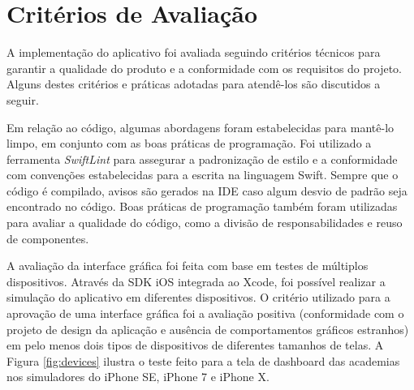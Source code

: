 \section{Critérios de Avaliação}
A implementação do aplicativo foi avaliada seguindo critérios técnicos para garantir a qualidade do produto e a conformidade com os requisitos do projeto. Alguns destes critérios e práticas adotadas para atendê-los são discutidos a seguir.

Em relação ao código, algumas abordagens foram estabelecidas para mantê-lo limpo, em conjunto com as boas práticas de programação. Foi utilizado a ferramenta \textit{SwiftLint}  para assegurar a padronização de estilo e a conformidade com convenções estabelecidas para a escrita na linguagem Swift. Sempre que o código é compilado, avisos são gerados na IDE caso algum desvio de padrão seja encontrado no código. Boas práticas de programação também foram utilizadas para avaliar a qualidade do código, como a divisão de responsabilidades e reuso de componentes.

A avaliação da interface gráfica foi feita com base em testes de múltiplos dispositivos. Através da SDK iOS integrada ao Xcode, foi possível realizar a simulação do aplicativo em diferentes dispositivos. O critério utilizado para a aprovação de uma interface gráfica foi a avaliação positiva (conformidade com o projeto de design da aplicação e ausência de comportamentos gráficos estranhos) em pelo menos dois tipos de dispositivos de diferentes tamanhos de telas. A Figura \ref{fig:devices} ilustra o teste feito para a tela de dashboard das academias nos simuladores do iPhone SE, iPhone 7 e iPhone X.

